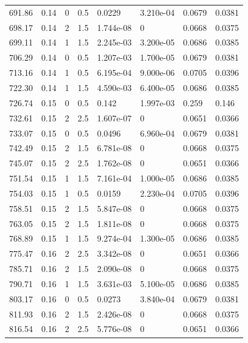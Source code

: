 \documentclass[preview]{standalone}
\begin{document}
{{{\begin{tabular}{L{1.2cm}C{1.2cm} C{0.3cm}C{0.5cm} C{1.4cm}C{1.4cm} C{1.4cm}C{1.4cm}}
  691.86  &  0.14  & 0     & 0.5 &  0.0229  & 3.210e-04  & 0.0679 &  0.0381   \\ 
  698.17  &  0.14  & 2     & 1.5 &  1.744e-08  & 0  & 0.0668 &  0.0375   \\ 
  699.11  &  0.14  & 1     & 1.5 &  2.245e-03  & 3.200e-05  & 0.0686 &  0.0385   \\ 
  706.29  &  0.14  & 0     & 0.5 &  1.207e-03  & 1.700e-05  & 0.0679 &  0.0381   \\ 
  713.16  &  0.14  & 1     & 0.5 &  6.195e-04  & 9.000e-06  & 0.0705 &  0.0396   \\ 
  722.30  &  0.14  & 1     & 1.5 &  4.590e-03  & 6.400e-05  & 0.0686 &  0.0385   \\ 
  726.74  &  0.15  & 0     & 0.5 &  0.142  & 1.997e-03  & 0.259 &  0.146   \\ 
  732.61  &  0.15  & 2     & 2.5 &  1.607e-07  & 0  & 0.0651 &  0.0366   \\ 
  733.07  &  0.15  & 0     & 0.5 &  0.0496  & 6.960e-04  & 0.0679 &  0.0381   \\ 
  742.49  &  0.15  & 2     & 1.5 &  6.781e-08  & 0  & 0.0668 &  0.0375   \\ 
  745.07  &  0.15  & 2     & 2.5 &  1.762e-08  & 0  & 0.0651 &  0.0366   \\ 
  751.54  &  0.15  & 1     & 1.5 &  7.161e-04  & 1.000e-05  & 0.0686 &  0.0385   \\ 
  754.03  &  0.15  & 1     & 0.5 &  0.0159  & 2.230e-04  & 0.0705 &  0.0396   \\ 
  758.51  &  0.15  & 2     & 1.5 &  5.847e-08  & 0  & 0.0668 &  0.0375   \\ 
  763.05  &  0.15  & 2     & 1.5 &  1.811e-08  & 0  & 0.0668 &  0.0375   \\ 
  768.89  &  0.15  & 1     & 1.5 &  9.274e-04  & 1.300e-05  & 0.0686 &  0.0385   \\ 
  775.47  &  0.16  & 2     & 2.5 &  3.342e-08  & 0  & 0.0651 &  0.0366   \\ 
  785.71  &  0.16  & 2     & 1.5 &  2.090e-08  & 0  & 0.0668 &  0.0375   \\ 
  790.71  &  0.16  & 1     & 1.5 &  3.631e-03  & 5.100e-05  & 0.0686 &  0.0385   \\ 
  803.17  &  0.16  & 0     & 0.5 &  0.0273  & 3.840e-04  & 0.0679 &  0.0381   \\ 
  811.93  &  0.16  & 2     & 1.5 &  2.426e-08  & 0  & 0.0668 &  0.0375   \\ 
  816.54  &  0.16  & 2     & 2.5 &  5.776e-08  & 0  & 0.0651 &  0.0366   \\ 

\end{tabular}}}}
\end{document}
